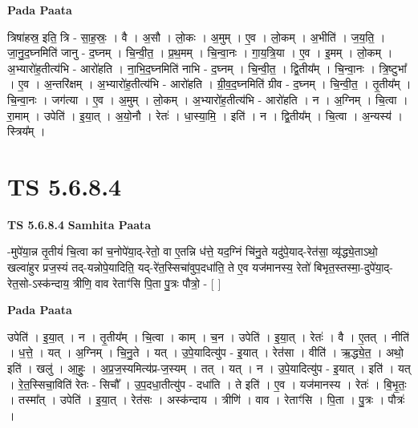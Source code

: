 \documentclass[17pt]{extarticle}
\begin{document}
\textbf{Pada Paata} \newline

त्रिषा॑हस्र॒ इति॒ त्रि - सा॒ह॒स्रः॒ । वै । अ॒सौ । लो॒कः । अ॒मुम् । ए॒व । लो॒कम् । अ॒भीति॑ । ज॒य॒ति॒ । जा॒नु॒द॒घ्नमिति॑ जानु - द॒घ्नम् । चि॒न्वी॒त॒ । प्र॒थ॒मम् । चि॒न्वा॒नः । गा॒य॒त्रि॒या । ए॒व । इ॒मम् । लो॒कम् । अ॒भ्यारो॑ह॒तीत्य॑भि - आरो॑हति । ना॒भि॒द॒घ्नमिति॑ नाभि - द॒घ्नम् । चि॒न्वी॒त॒ ।  द्वि॒तीय᳚म् । चि॒न्वा॒नः । त्रि॒ष्टुभा᳚ । ए॒व । अ॒न्तरि॑क्षम् । अ॒भ्यारो॑ह॒तीत्य॑भि - आरो॑हति । ग्री॒व॒द॒घ्नमिति॑ ग्रीव - द॒घ्नम् । चि॒न्वी॒त॒ । तृ॒तीय᳚म् । चि॒न्वा॒नः । जग॑त्या । ए॒व । अ॒मुम् ।  लो॒कम् । अ॒भ्यारो॑ह॒तीत्य॑भि - आरो॑हति । न । अ॒ग्निम् । चि॒त्वा । रा॒माम् । उपेति॑ । इ॒या॒त् । अ॒यो॒नौ । रेतः॑ । धा॒स्या॒मि॒ । इति॑ । न । द्वि॒तीय᳚म् । चि॒त्वा । अ॒न्यस्य॑ । स्त्रिय᳚म् ।  \newline




\section*{ TS 5.6.8.4 }

\textbf{TS 5.6.8.4 } \newline
\textbf{Samhita Paata} \newline

-मुपे॑या॒न्न तृ॒तीयं॑ चि॒त्वा कां च॒नोपे॑या॒द्-रेतो॒ वा ए॒तन्नि ध॑त्ते॒ यद॒ग्निं चि॑नु॒ते यदु॑पे॒याद्-रेत॑सा॒ व्यृ॑द्ध्ये॒ताऽथो॒ खल्वा॑हुर प्रज॒स्यं तद्-यन्नोपे॒यादिति॒ यद्-रे॑त॒स्सिचा॑वुप॒दधा॑ति॒ ते ए॒व यज॑मानस्य॒ रेतो॑ बिभृत॒स्तस्मा॒-दुपे॑या॒द्-रेत॒सो-ऽस्क॑न्दाय॒ त्रीणि॒ वाव रेताꣳ॑सि पि॒ता पु॒त्रः पौत्रो॒ - [  ] \newline

\textbf{Pada Paata} \newline

उपेति॑ । इ॒या॒त् । न । तृ॒तीय᳚म् । चि॒त्वा । काम् । च॒न । उपेति॑ । इ॒या॒त् । रेतः॑ । वै । ए॒तत् । नीति॑ । ध॒त्ते॒ । यत् । अ॒ग्निम् । चि॒नु॒ते । यत् । उ॒पे॒यादित्यु॑प - इ॒यात् । रेत॑सा । वीति॑ । ऋ॒द्ध्ये॒त॒ । अथो॒ इति॑ । खलु॑ । आ॒हुः॒ । अ॒प्र॒ज॒स्यमित्य॑प्र-ज॒स्यम् । तत् । यत् । न । उ॒पे॒यादित्यु॑प - इ॒यात् । इति॑ । यत् । रे॒त॒स्सिचा॒विति॑ रेतः - सिचौ᳚ । उ॒प॒दधा॒तीत्यु॑प - दधा॑ति । ते इति॑ । ए॒व । यज॑मानस्य । रेतः॑ । बि॒भृ॒तः॒ । तस्मा᳚त् । उपेति॑ । इ॒या॒त् । रेत॑सः । अस्क॑न्दाय । त्रीणि॑ । वाव । रेताꣳ॑सि । पि॒ता । पु॒त्रः । पौत्रः॑ ।  \newline
\end{document}
